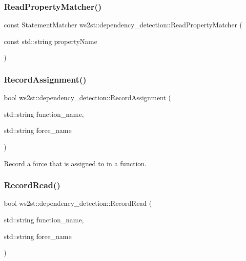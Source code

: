 \subsubsection{\texorpdfstring{Read\+Property\+Matcher()}{ReadPropertyMatcher()}}
{\footnotesize\ttfamily const Statement\+Matcher ws2st\+::dependency\+\_\+detection\+::\+Read\+Property\+Matcher (\begin{DoxyParamCaption}\item[{const std\+::string}]{property\+Name }\end{DoxyParamCaption})}

\mbox{\label{namespacews2st_1_1dependency__detection_afa94b48529c6c085e21d3025069d8085}} 
\subsubsection{\texorpdfstring{Record\+Assignment()}{RecordAssignment()}}
{\footnotesize\ttfamily bool ws2st\+::dependency\+\_\+detection\+::\+Record\+Assignment (\begin{DoxyParamCaption}\item[{std\+::string}]{function\+\_\+name,  }\item[{std\+::string}]{force\+\_\+name }\end{DoxyParamCaption})}



Record a force that is assigned to in a function. 

\mbox{\label{namespacews2st_1_1dependency__detection_ab3cedd87fe75ce246104ca77531d29b2}} 
\subsubsection{\texorpdfstring{Record\+Read()}{RecordRead()}}
{\footnotesize\ttfamily bool ws2st\+::dependency\+\_\+detection\+::\+Record\+Read (\begin{DoxyParamCaption}\item[{std\+::string}]{function\+\_\+name,  }\item[{std\+::string}]{force\+\_\+name }\end{DoxyParamCaption})}



